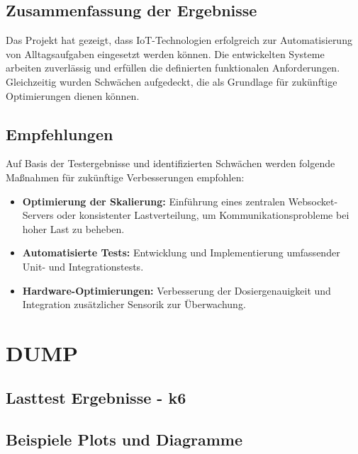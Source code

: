 \subsection{Zusammenfassung der Ergebnisse}

Das Projekt hat gezeigt, dass IoT-Technologien erfolgreich zur Automatisierung von Alltagsaufgaben eingesetzt werden können. Die entwickelten Systeme arbeiten zuverlässig und erfüllen die definierten funktionalen Anforderungen. Gleichzeitig wurden Schwächen aufgedeckt, die als Grundlage für zukünftige Optimierungen dienen können.

\subsection{Empfehlungen}

Auf Basis der Testergebnisse und identifizierten Schwächen werden folgende Maßnahmen für zukünftige Verbesserungen empfohlen:
\begin{itemize}
  \item \textbf{Optimierung der Skalierung:} Einführung eines zentralen Websocket-Servers oder konsistenter Lastverteilung, um Kommunikationsprobleme bei hoher Last zu beheben.
  \item \textbf{Automatisierte Tests:} Entwicklung und Implementierung umfassender Unit- und Integrationstests.
  \item \textbf{Hardware-Optimierungen:} Verbesserung der Dosiergenauigkeit und Integration zusätzlicher Sensorik zur Überwachung.
\end{itemize}

\section{DUMP}

\subsection{Lasttest Ergebnisse - k6}

\subsection{Beispiele Plots und Diagramme}

